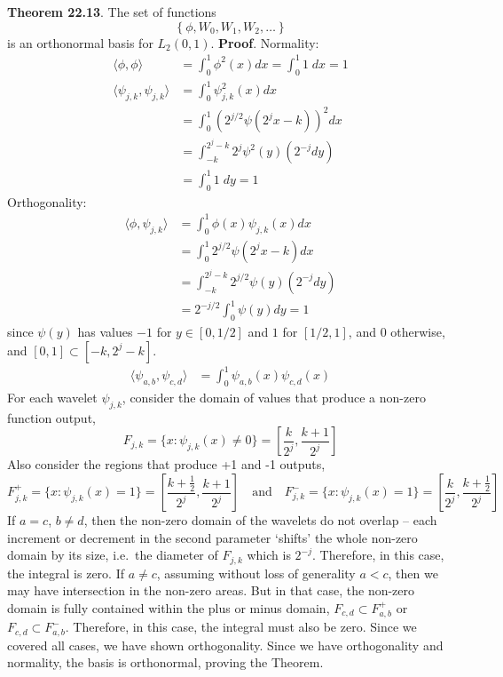 \textbf{Theorem 22.13}. The set of functions
\[
\left\{ \phi, W_{0}, W_{1}, W_{2}, \dots \right\}
\]
is an orthonormal basis for \(L_{2}(0, 1)\).
\textbf{Proof}.
Normality:
\begin{align*}
\langle \phi, \phi \rangle &= \int_{0}^{1} \phi^{2}(x) dx = \int_{0}^{1} 1 \; dx = 1 \\
\langle \psi_{j, k}, \psi_{j, k} \rangle &= \int_{0}^{1} \psi_{j, k}^{2}(x) dx \\
&= \int_{0}^{1} \left( 2^{j / 2} \psi(2^{j} x - k) \right)^{2} dx \\
&= \int_{-k}^{2^{j} - k} 2^{j}  \psi^{2}(y) \left( 2^{-j} dy \right) \\
&= \int_{0}^{1} 1 \; dy = 1
\end{align*}
Orthogonality:
\begin{align*}
\langle \phi, \psi_{j, k} \rangle &= \int_{0}^{1} \phi(x) \psi_{j, k}(x) dx \\
&= \int_{0}^{1}  2^{j / 2} \psi(2^{j} x - k) dx  \\
&= \int_{-k}^{2^{j} - k} 2^{j / 2}  \psi(y) \left( 2^{-j} dy \right) \\
&= 2^{-j/2} \int_{0}^{1} \psi(y) dy = 1
\end{align*}
since \(\psi(y)\) has values \(-1\) for \(y \in [0, 1/2]\) and \(1\) for
\([1/2, 1]\), and 0 otherwise, and \([0, 1] \subset [-k, 2^{j} - k]\).
\begin{align*}
\langle \psi_{a, b}, \psi_{c, d} \rangle &= \int_{0}^{1} \psi_{a, b}(x) \psi_{c, d}(x)
\end{align*}
For each wavelet \(\psi_{j, k}\), consider the domain of values that
produce a non-zero function output,
\[
F_{j, k} = \{ x : \psi_{j, k}(x) \neq 0 \} = \left[\frac{k}{2^{j}}, \frac{k + 1}{2^{j}} \right]
\]
Also consider the regions that produce +1 and -1 outputs,
\[
F_{j, k}^+ = \{ x : \psi_{j, k}(x) = 1 \} = \left[\frac{k + \frac{1}{2}}{2^{j}}, \frac{k + 1}{2^{j}} \right]
\quad \text{and} \quad
F_{j, k}^- = \{ x : \psi_{j, k}(x) = 1 \} = \left[\frac{k}{2^{j}}, \frac{k + \frac{1}{2}}{2^{j}} \right]
\]
If \(a = c\), \(b \neq d\), then the non-zero domain of the wavelets do
not overlap -- each increment or decrement in the second parameter
`shifts' the whole non-zero domain by its size, i.e.~the diameter of
\(F_{j, k}\) which is \(2^{-j}\). Therefore, in this case, the integral
is zero.
If \(a \neq c\), assuming without loss of generality \(a < c\), then we
may have intersection in the non-zero areas. But in that case, the
non-zero domain is fully contained within the plus or minus domain,
\(F_{c, d} \subset F_{a, b}^+\) or \(F_{c, d} \subset F_{a, b}^-\).
Therefore, in this case, the integral must also be zero.
Since we covered all cases, we have shown orthogonality. Since we have
orthogonality and normality, the basis is orthonormal, proving the
Theorem.


